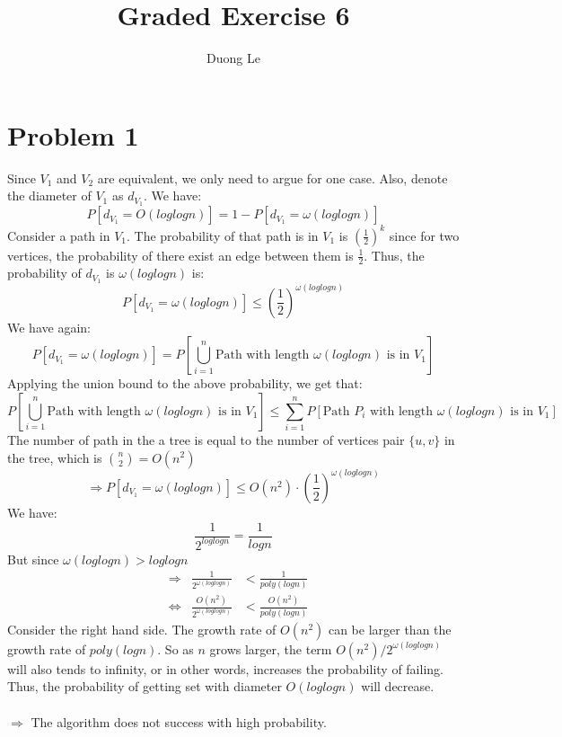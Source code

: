 \documentclass{article}
\title{Graded Exercise 6}
\author{Duong Le}
\date{}
\begin{document}
\maketitle

\section*{Problem 1}
Since $V_1$ and $V_2$ are equivalent, we only need to argue for one case. Also, denote the diameter of $V_1$ as $d_{V_1}$. We have:
\[
P[d_{V_1} = O(loglogn)] = 1 - P[d_{V_1} = \omega(loglogn)]
\]
Consider a path in $V_1$. The probability of that path is in $V_1$ is $(\frac{1}{2})^k$ since for two vertices, the probability of there exist an edge between them is $\frac{1}{2}$. Thus, the probability of $d_{V_1}$ is $\omega(loglogn)$ is:
\[
P[d_{V_1} = \omega(loglogn)] \leq \left( \frac{1}{2} \right)^{\omega(loglogn)}
\]
We have again:
\[
P[d_{V_1} = \omega(loglogn)] = P\left[ \bigcup_{i=1}^{n} \text{Path with length $\omega(loglogn)$ is in $V_1$} \right]
\]
Applying the union bound to the above probability, we get that:
\[
P\left[ \bigcup_{i=1}^{n} \text{Path with length $\omega(loglogn)$ is in $V_1$} \right] \leq \sum_{i=1}^{n} P[\text{Path $P_i$ with length $\omega(loglogn)$ is in $V_1$}]
\]
The number of path in the a tree is equal to the number of vertices pair $\{u, v\}$ in the tree, which is ${n \choose 2} = O(n^2)$
\[
\Rightarrow P[d_{V_1} = \omega(loglogn)] \leq O(n^2) \cdot \left( \frac{1}{2} \right)^{\omega(loglogn)}
\]
We have:
\[
\frac{1}{2^{loglogn}} = \frac{1}{logn}
\]
But since $\omega(loglogn) > loglogn$
\[
\begin{aligned}
&\Rightarrow     & \frac{1}{2^{\omega(loglogn)}} &< \frac{1}{poly(logn)} \\
&\Leftrightarrow& \frac{O(n^2)}{2^{\omega(loglogn)}} &< \frac{O(n^2)}{poly(logn)}
\end{aligned}
\]
Consider the right hand side. The growth rate of $O(n^2)$ can be larger than the growth rate of $poly(logn)$. So as $n$ grows larger, the term $O(n^2) /2^{\omega(loglogn)}$ will also tends to infinity, or in other words, increases the probability of failing. Thus, the probability of getting set with diameter $O(loglogn)$ will decrease. \\\\
$\Rightarrow$ The algorithm does not success with high probability.



\pagebreak
\end{document}
